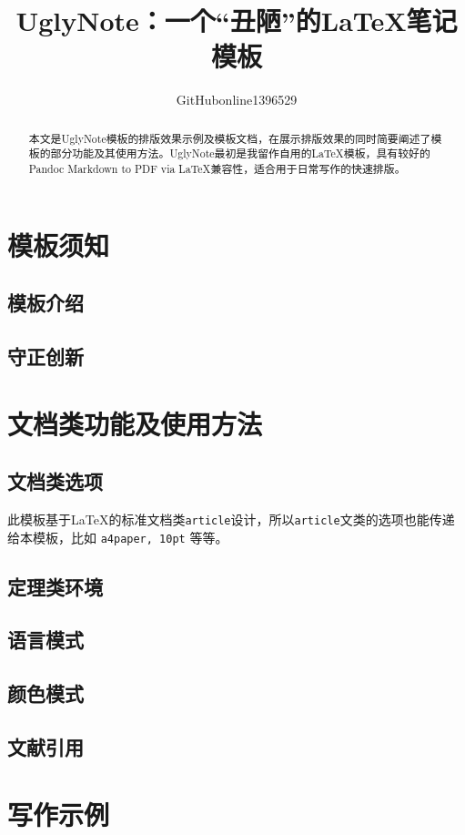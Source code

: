 \documentclass[12pt, blue]{uglynote}
\title{\bfseries UglyNote：一个“丑陋”的\LaTeX{}笔记模板}
\author{GitHubonline1396529}
\date{\zhdate{2022/12/31}}
\begin{document}
\maketitle
\begin{abstract}
    本文是UglyNote模板的排版效果示例及模板文档，在展示排版效果的同时简要阐述了模板的部分功能及其使用方法。UglyNote最初是我留作自用的\LaTeX 模板，具有较好的Pandoc Markdown to PDF via \LaTeX 兼容性，适合用于日常写作的快速排版。

\end{abstract}

\section{模板须知}
\subsection{模板介绍}


\subsection{守正创新}


\section{文档类功能及使用方法}
\subsection{文档类选项}\label{ssec:classoptions}

此模板基于\LaTeX{}的标准文档类\texttt{article}设计，所以\texttt{article}文类的选项也能传递给本模板，比如 \texttt{a4paper, 10pt} 等等。



\subsection{定理类环境}


\subsection{语言模式}


\subsection{颜色模式}\label{ssec:colors}


\subsection{文献引用}


\section{写作示例}



\printbibliography[
  title=\ebibname]

\appendix
\addappheadtotoc
\end{document}

